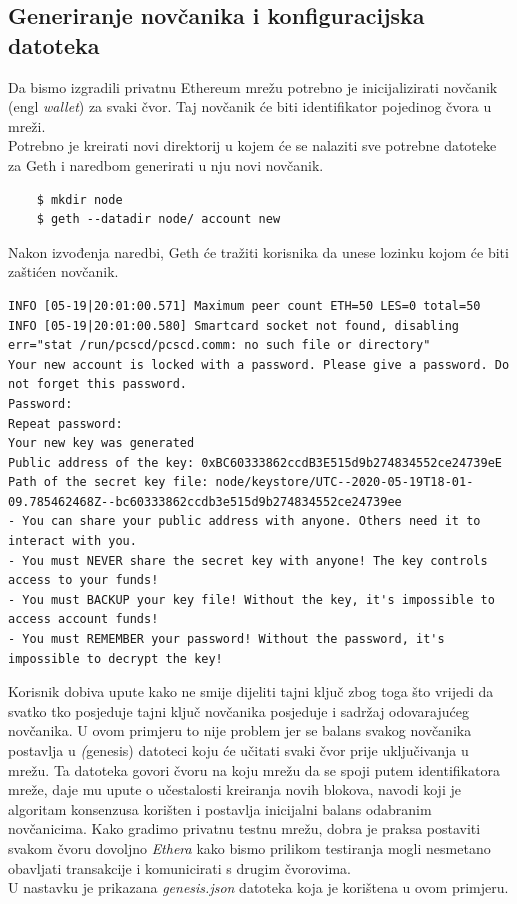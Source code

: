 \documentclass[times, utf8, zavrsni, numeric]{fer}
\begin{document}
\subsection{Generiranje novčanika i konfiguracijska datoteka}
Da bismo izgradili privatnu Ethereum mrežu potrebno je inicijalizirati novčanik (engl \emph{wallet}) za svaki čvor. Taj novčanik
će biti identifikator pojedinog čvora u mreži. \\
Potrebno je kreirati novi direktorij u kojem će se nalaziti sve potrebne datoteke za Geth i naredbom generirati u nju novi novčanik.

\begin{lstlisting}
    $ mkdir node
    $ geth --datadir node/ account new
\end{lstlisting}

Nakon izvođenja naredbi, Geth će tražiti korisnika da unese lozinku kojom će biti zaštićen novčanik.

\begin{lstlisting}
INFO [05-19|20:01:00.571] Maximum peer count ETH=50 LES=0 total=50
INFO [05-19|20:01:00.580] Smartcard socket not found, disabling err="stat /run/pcscd/pcscd.comm: no such file or directory"
Your new account is locked with a password. Please give a password. Do not forget this password.
Password: 
Repeat password: 
Your new key was generated
Public address of the key: 0xBC60333862ccdB3E515d9b274834552ce24739eE
Path of the secret key file: node/keystore/UTC--2020-05-19T18-01-09.785462468Z--bc60333862ccdb3e515d9b274834552ce24739ee
- You can share your public address with anyone. Others need it to interact with you.
- You must NEVER share the secret key with anyone! The key controls access to your funds!
- You must BACKUP your key file! Without the key, it's impossible to access account funds!
- You must REMEMBER your password! Without the password, it's impossible to decrypt the key!
\end{lstlisting}

Korisnik dobiva upute kako ne smije dijeliti tajni ključ zbog toga što vrijedi da svatko tko posjeduje tajni ključ novčanika
posjeduje i sadržaj odovarajućeg novčanika. U ovom primjeru to nije problem jer se balans svakog novčanika postavlja u \emph(genesis)
datoteci koju će učitati svaki čvor prije uključivanja u mrežu. Ta datoteka govori čvoru na koju mrežu da se spoji putem identifikatora
mreže, daje mu upute o učestalosti kreiranja novih blokova, navodi koji je algoritam konsenzusa korišten i postavlja inicijalni balans
odabranim novčanicima. Kako gradimo privatnu testnu mrežu, dobra je praksa postaviti svakom čvoru dovoljno \emph{Ethera} kako bismo
prilikom testiranja mogli nesmetano obavljati transakcije i komunicirati s drugim čvorovima. \\
U nastavku je prikazana \emph{genesis.json} datoteka koja je korištena u ovom primjeru.
\end{document}
